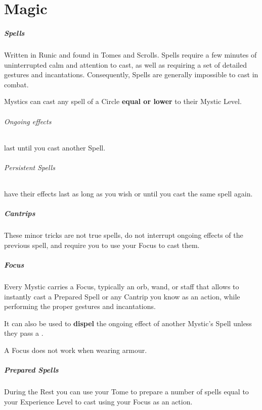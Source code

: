\documentclass[itdr]{subfiles}
\begin{document}
\chapter{Magic}
\label{ch:magic}

\paragraph{Spells}
Written in Runic and found in Tomes and Scrolls. Spells require a few minutes of uninterrupted calm and attention to cast, as well as requiring a set of detailed gestures and incantations. Consequently, Spells are generally impossible to cast in combat.

Mystics can cast any spell of a Circle \textbf{equal or lower} to their Mystic Level.

\subparagraph{Ongoing effects} last until you cast another Spell.

\subparagraph{Persistent Spells} have their effects last as long as you wish or until you cast the same spell again.

\paragraph{Cantrips}
These minor tricks are not true spells, do not interrupt ongoing effects of the previous spell, and require you to use your Focus to cast them.

\vfill
{}
\paragraph{Focus}
Every Mystic carries a Focus, typically an orb, wand, or staff that allows to instantly cast a Prepared Spell or any Cantrip you know as an action, while performing the proper gestures and incantations.

It can also be used to \textbf{dispel} the ongoing effect of another Mystic's Spell unless they pass a .

A Focus does not work when wearing armour.

\vfill
{}
\paragraph{Prepared Spells}
During the Rest you can use your Tome to prepare a number of spells equal to your Experience Level to cast using your Focus as an action.
\end{document}
